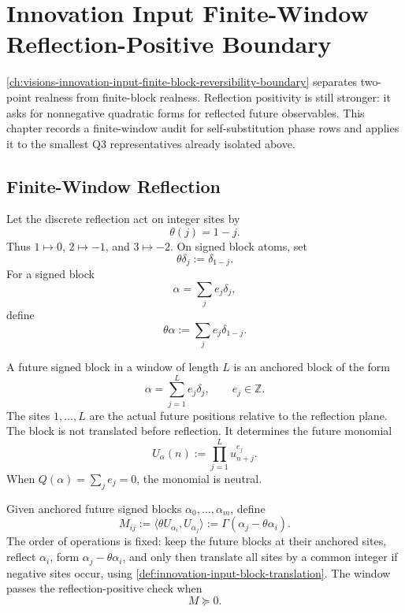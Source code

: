 \chapter{Innovation Input Finite-Window Reflection-Positive Boundary}
\label{ch:visions-innovation-input-finite-window-rp-boundary}

\autoref{ch:visions-innovation-input-finite-block-reversibility-boundary}
separates two-point realness from finite-block realness. Reflection
positivity is still stronger: it asks for nonnegative quadratic forms for
reflected future observables. This chapter records a finite-window audit
for self-substitution phase rows and applies it to the smallest Q3
representatives already isolated above.

\section{Finite-Window Reflection}
\label{sec:innovation-input-finite-window-reflection}

\begin{definition}
\label{def:innovation-input-discrete-reflection}
Let the discrete reflection act on integer sites by
$$
\theta(j)=1-j.
$$
Thus $1\mapsto0$, $2\mapsto-1$, and $3\mapsto-2$. On signed block atoms,
set
$$
\theta\delta_j:=\delta_{1-j}.
$$
For a signed block
$$
\alpha=\sum_j e_j\delta_j,
$$
define
$$
\theta\alpha:=\sum_j e_j\delta_{1-j}.
$$
\end{definition}

\begin{definition}
\label{def:innovation-input-future-monomial}
A future signed block in a window of length $L$ is an anchored block of
the form
$$
\alpha=\sum_{j=1}^L e_j\delta_j,
\qquad
e_j\in\mathbb Z.
$$
The sites $1,\ldots,L$ are the actual future positions relative to the
reflection plane. The block is not translated before reflection.
It determines the future monomial
$$
U_\alpha(n):=\prod_{j=1}^L u_{n+j}^{e_j}.
$$
When $Q(\alpha)=\sum_j e_j=0$, the monomial is neutral.
\end{definition}

\begin{definition}
\label{def:innovation-input-finite-window-rp-matrix}
Given anchored future signed blocks $\alpha_0,\ldots,\alpha_m$, define
$$
M_{ij}
:=
\langle \theta U_{\alpha_i},U_{\alpha_j}\rangle
:=
\Gamma(\alpha_j-\theta\alpha_i).
$$
The order of operations is fixed: keep the future blocks at their anchored
sites, reflect $\alpha_i$, form $\alpha_j-\theta\alpha_i$, and only then
translate all sites by a common integer if negative sites occur, using
\autoref{def:innovation-input-block-translation}. The window passes the
reflection-positive check when
$$
M\succeq0.
$$
\end{definition}

